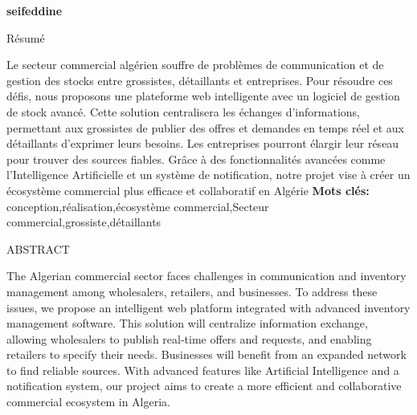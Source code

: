 \documentclass[edit,12pt,a4paper,ChapStyle,oneside,doubleinterligne]{report}
\begin{document}
\begin{flushright}
    \textbf{seifeddine}

\end{flushright}
\newpage
\begin{center}
\huge{Résumé} 
\end{center}
\phantom{hhhh}Le secteur commercial algérien souffre de problèmes de communication et de gestion des stocks entre grossistes, détaillants et entreprises. Pour résoudre ces défis, nous proposons une plateforme web intelligente avec un logiciel de gestion de stock avancé. Cette solution centralisera les échanges d'informations, permettant aux grossistes de publier des offres et demandes en temps réel et aux détaillants d'exprimer leurs besoins. Les entreprises pourront élargir leur réseau pour trouver des sources fiables. Grâce à des fonctionnalités avancées comme l'Intelligence Artificielle et un système de notification, notre projet vise à créer un écosystème commercial plus efficace et collaboratif en Algérie
\newline\textbf{Mots clés:} conception,réalisation,écosystème commercial,Secteur commercial,grossiste,détaillants
\begin{center}
\huge{ABSTRACT} 
\end{center}
\phantom{hhhh} The Algerian commercial sector faces challenges in communication and inventory management among wholesalers, retailers, and businesses. To address these issues, we propose an intelligent web platform integrated with advanced inventory management software. This solution will centralize information exchange, allowing wholesalers to publish real-time offers and requests, and enabling retailers to specify their needs. Businesses will benefit from an expanded network to find reliable sources. With advanced features like Artificial Intelligence and a notification system, our project aims to create a more efficient and collaborative commercial ecosystem in Algeria.


\newpage 
\thispagestyle{empty}
\tableofcontents
\thispagestyle{empty}
\listoffigures
\thispagestyle{empty}
\listoftables
\thispagestyle{empty}
\newpage
\end{document}
